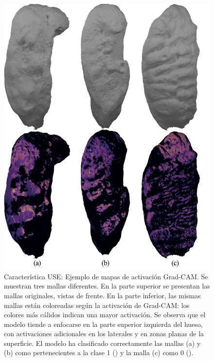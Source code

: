 \begin{figure}[htbp]
    \centering
    \includegraphics[width=\linewidth]{figures/5_experiments/grad-cam-USE-samples.png}
    \caption[Característica USE: Ejemplo de mapas de activación Grad-CAM]{Característica USE: Ejemplo de mapas de activación Grad-CAM. Se muestran tres mallas diferentes. En la parte superior se presentan las mallas originales, vistas de frente. En la parte inferior, las mismas mallas están coloreadas según la activación de Grad-CAM: los colores más cálidos indican una mayor activación. Se observa que el modelo tiende a enfocarse en la parte superior izquierda del hueso, con activaciones adicionales en los laterales y en zonas planas de la superficie. El modelo ha clasificado correctamente las mallas (a) y (b) como pertenecientes a la clase 1 () y la malla (c) como 0 ().}
    \label{fig5:grad_cam__USE_samples}
\end{figure}


